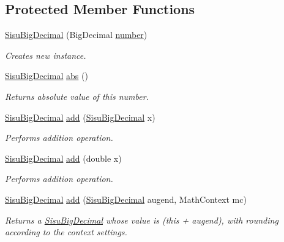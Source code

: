 \subsection*{Protected Member Functions}
\begin{DoxyCompactItemize}
\item 
\hyperlink{classcom_1_1aarrelaakso_1_1drawl_1_1_sisu_big_decimal_a2073791c3fc4e6d6cbbd9a6e7b83e295}{Sisu\+Big\+Decimal} (Big\+Decimal \hyperlink{classcom_1_1aarrelaakso_1_1drawl_1_1_sisu_big_decimal_af27e00f82037e4c3658558cd6c81af06}{number})
\begin{DoxyCompactList}\small\item\em Creates new instance. \end{DoxyCompactList}\item 
\hyperlink{classcom_1_1aarrelaakso_1_1drawl_1_1_sisu_big_decimal}{Sisu\+Big\+Decimal} \hyperlink{classcom_1_1aarrelaakso_1_1drawl_1_1_sisu_big_decimal_a7b9d58fa45206483a9ca603c118d7fae}{abs} ()
\begin{DoxyCompactList}\small\item\em Returns absolute value of this number. \end{DoxyCompactList}\item 
\hyperlink{classcom_1_1aarrelaakso_1_1drawl_1_1_sisu_big_decimal}{Sisu\+Big\+Decimal} \hyperlink{classcom_1_1aarrelaakso_1_1drawl_1_1_sisu_big_decimal_aed9db04cdf1516cc87d0599b99fb6b02}{add} (\hyperlink{classcom_1_1aarrelaakso_1_1drawl_1_1_sisu_big_decimal}{Sisu\+Big\+Decimal} x)
\begin{DoxyCompactList}\small\item\em Performs addition operation. \end{DoxyCompactList}\item 
\hyperlink{classcom_1_1aarrelaakso_1_1drawl_1_1_sisu_big_decimal}{Sisu\+Big\+Decimal} \hyperlink{classcom_1_1aarrelaakso_1_1drawl_1_1_sisu_big_decimal_a20a8c4842d23a2a5394eed4bc7d19251}{add} (double x)
\begin{DoxyCompactList}\small\item\em Performs addition operation. \end{DoxyCompactList}\item 
\hyperlink{classcom_1_1aarrelaakso_1_1drawl_1_1_sisu_big_decimal}{Sisu\+Big\+Decimal} \hyperlink{classcom_1_1aarrelaakso_1_1drawl_1_1_sisu_big_decimal_ac90515f60f6f93b09d76ea389ffe689a}{add} (\hyperlink{classcom_1_1aarrelaakso_1_1drawl_1_1_sisu_big_decimal}{Sisu\+Big\+Decimal} augend, Math\+Context mc)
\begin{DoxyCompactList}\small\item\em Returns a \hyperlink{classcom_1_1aarrelaakso_1_1drawl_1_1_sisu_big_decimal}{Sisu\+Big\+Decimal} whose value is (this + augend), with rounding according to the context settings. \end{DoxyCompactList}\item 

\end{DoxyCompactItemize}
